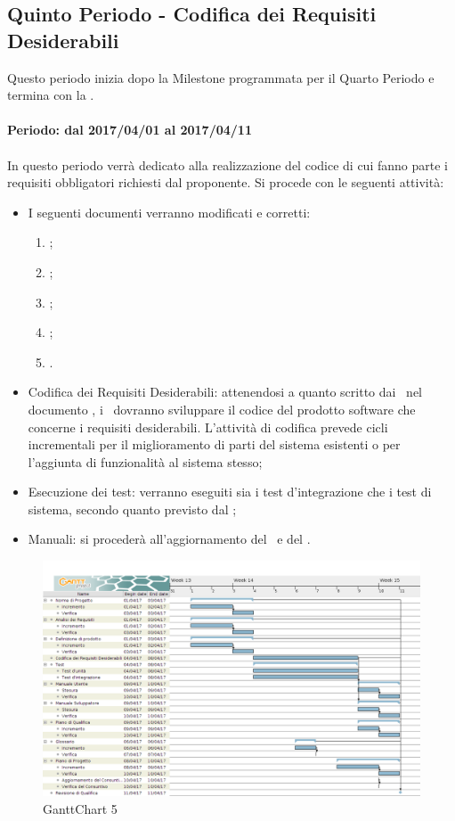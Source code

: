 \documentclass[../PianoDiProgetto_v3.0.0.tex]{subfiles}
\begin{document}
	\newpage
	\subsection{Quinto Periodo - Codifica dei Requisiti Desiderabili}
	Questo periodo inizia dopo la Milestone programmata per il Quarto Periodo e termina con la \revisionediqualifica.
	\\
	\\
	\textbf{Periodo: dal 2017/04/01 al 2017/04/11}
	\\
	\\
	 In questo periodo verrà dedicato alla realizzazione del codice di cui fanno parte i requisiti obbligatori richiesti dal proponente.
	Si procede con le seguenti attività:
	\begin{itemize}
		\item I seguenti documenti verranno modificati e corretti:
			\begin{enumerate}
				\item \manualesviluppatore;
				\item \manualeutente;
				\item \pianodiqualifica;
				\item \pianodiprogetto;
				\item \glossario.
			\end{enumerate}
		\item Codifica dei Requisiti Desiderabili: attenendosi a quanto scritto dai \progettisti\ nel documento , i \programmatori\ dovranno sviluppare il codice del prodotto software che concerne i requisiti desiderabili. L'attività di codifica prevede cicli incrementali per il miglioramento di parti del sistema esistenti o per l'aggiunta di funzionalità al sistema stesso;
		\item Esecuzione dei test: verranno eseguiti sia i test d'integrazione che i test di sistema, secondo quanto previsto dal \pianodiqualifica;		
		\item Manuali: si procederà all'aggiornamento del \manualeutente\ e del \manualesviluppatore.
	\end{itemize}
	
	\newpage
	\begin{figure}[!h]
		\centering
		\includegraphics[width=\textwidth]{Pianificazione/Immagini/GanttChart05.png}
		\caption{GanttChart 5}
	\end{figure}	
	
\end{document}
